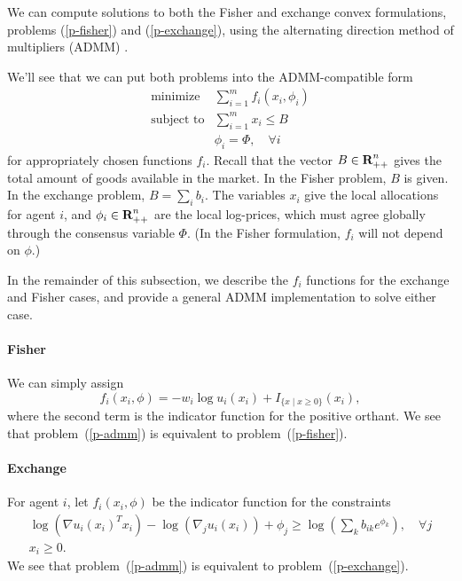 \documentclass[12pt]{article}
\begin{document}
We can compute solutions to both the Fisher and exchange convex
formulations, problems (\ref{p-fisher}) and (\ref{p-exchange}), using
the alternating direction method of multipliers (ADMM) \cite{boyd2011distributed, parikh2013proximal}.

We'll see that we can put both problems into the ADMM-compatible form
\begin{equation}
\label{p-admm}
\begin{array}{ll}
\mbox{minimize} & \sum_{i=1}^m f_i(x_i, \phi_i) \\
\mbox{subject to} & \sum_{i=1}^m x_i \leq B\\
& \phi_i = \Phi, \quad \forall i
\end{array}
\end{equation}
for appropriately chosen functions $f_i$.
Recall that the vector $B \in {\mbox{\bf R}}^n_{++}$ gives the total
amount of goods available in the market. In the Fisher problem,
$B$ is given.
In the exchange problem, $B = \sum_i b_i$.
The variables $x_i$ give the local allocations for agent $i$, and
$\phi_i \in {\mbox{\bf R}}^n_{++}$
are the local log-prices, which must agree globally through the
consensus variable $\Phi$.
(In the Fisher formulation, $f_i$ will not depend on $\phi$.)

In the remainder of this subsection, we describe the $f_i$ functions for the exchange and Fisher cases, and provide a general
ADMM implementation to solve either case.

\paragraph{Fisher}
We can simply assign
\[
f_i(x_i, \phi) = -w_i \log u_i(x_i) + I_{\lbrace x \mid x \geq 0 \rbrace}(x_i),
\]
where the second term is the indicator function for the positive orthant.
We see that problem~(\ref{p-admm}) is equivalent to
problem~(\ref{p-fisher}).

\paragraph{Exchange}

For agent $i$, let $f_i(x_i, \phi)$ be the indicator function for the
constraints
\[
\begin{array}{c}
\log(\nabla u_i(x_i)^T x_i) - \log(\nabla_j u_i(x_i)) + \phi_j \geq  \log\left(\sum_k b_{ik} e^{\phi_{k}}\right),\quad \forall j\\
x_i \geq 0.
\end{array}
\]
We see that problem~(\ref{p-admm}) is equivalent to problem~(\ref{p-exchange}).
\end{document}

